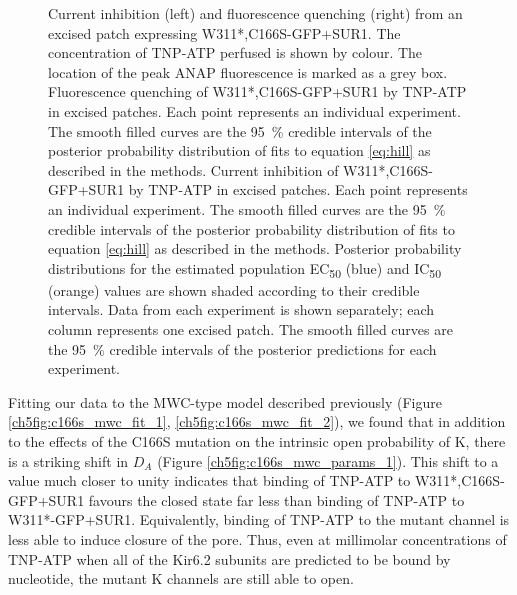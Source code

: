 \begin{figure}[h]
	\caption[C166S alters sensitivity to nucleotide inhibition]{
	 Current inhibition (left) and fluorescence quenching (right) from an excised patch expressing W311*,C166S-GFP+SUR1.
	The concentration of TNP-ATP perfused is shown by colour.
	The location of the peak ANAP fluorescence is marked as a grey box.
	 Fluorescence quenching of W311*,C166S-GFP+SUR1 by TNP-ATP in excised patches.
	Each point represents an individual experiment.
	The smooth filled curves are the \SI{95}{\percent} credible intervals of the posterior probability distribution of fits to equation \ref{eq:hill} as described in the methods.
	 Current inhibition of W311*,C166S-GFP+SUR1 by TNP-ATP in excised patches.
	Each point represents an individual experiment.
	The smooth filled curves are the \SI{95}{\percent} credible intervals of the posterior probability distribution of fits to equation \ref{eq:hill} as described in the methods.
	 Posterior probability distributions for the estimated population EC\textsubscript{50} (blue) and IC\textsubscript{50} (orange) values are shown shaded according to their credible intervals.
	 Data from each experiment is shown separately; each column represents one excised patch.
	The smooth filled curves are the \SI{95}{\percent} credible intervals of the posterior predictions for each experiment.
	}\label{ch5fig:c166s_2}
\end{figure}

Fitting our data to the MWC-type model described previously (Figure \ref{ch5fig:c166s_mwc_fit_1}, \ref{ch5fig:c166s_mwc_fit_2}), we found that in addition to the effects of the C166S mutation on the intrinsic open probability of K\ATP{}, there is a striking shift in $D_A$ (Figure \ref{ch5fig:c166s_mwc_params_1}).
This shift to a value much closer to unity indicates that binding of TNP-ATP to W311*,C166S-GFP+SUR1 favours the closed state far less than binding of TNP-ATP to W311*-GFP+SUR1.
Equivalently, binding of TNP-ATP to the mutant channel is less able to induce closure of the pore.
Thus, even at millimolar concentrations of TNP-ATP when all of the Kir6.2 subunits are predicted to be bound by nucleotide, the mutant K\ATP{} channels are still able to open.

